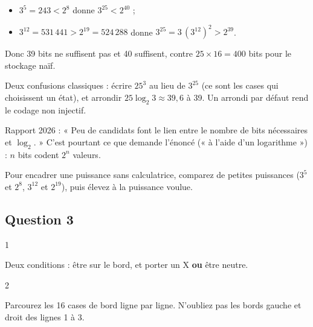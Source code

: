 \documentclass[11pt,a4paper]{article}
\providecommand{\tightlist}{\setlength{\itemsep}{0pt}\setlength{\parskip}{0pt}}
\begin{document}
\begin{itemize}
\tightlist
\item
  \(3^5=243<2^8\) donne \(3^{25}<2^{40}\) ;
\item
  \(3^{12}=531\,441>2^{19}=524\,288\) donne \(3^{25}=3\,(3^{12})^2>2^{39}\).
\end{itemize}

Donc 39 bits ne suffisent pas et 40 suffisent, contre \(25\times16=400\) bits pour le stockage naïf.

\begin{piege}

Deux confusions classiques : écrire \(25^3\) au lieu de \(3^{25}\) (ce sont les cases qui choisissent un état), et arrondir \(25\log_2 3\approx39{,}6\) à 39. Un arrondi par défaut rend le codage non injectif.

\end{piege}

\begin{jury}

Rapport 2026 : « Peu de candidats font le lien entre le nombre de bits nécessaires et \(\log_2\). » C'est pourtant ce que demande l'énoncé (« à l'aide d'un logarithme ») : \(n\) bits codent \(2^n\) valeurs.

\end{jury}

\begin{methode}

Pour encadrer une puissance sans calculatrice, comparez de petites puissances (\(3^5\) et \(2^8\), \(3^{12}\) et \(2^{19}\)), puis élevez à la puissance voulue.

\end{methode}

\hypertarget{question-3}{%
\subsection{Question 3}\label{question-3}}

\begin{indication}{1}

Deux conditions : être sur le bord, et porter un X \textbf{ou} être neutre.

\end{indication}

\begin{indication}{2}

Parcourez les 16 cases de bord ligne par ligne. N'oubliez pas les bords gauche et droit des lignes 1 à 3.

\end{indication}
\end{document}
